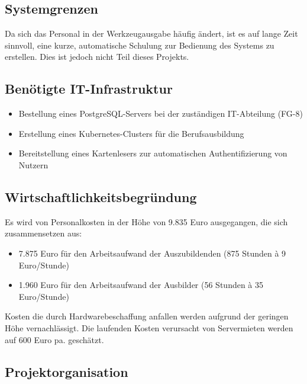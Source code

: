 \documentclass[a4paper, 12pt]{article}
\begin{document}
\vspace{1cm}

\subsection{Systemgrenzen}
Da sich das Personal in der Werkzeugausgabe häufig ändert, ist es auf lange Zeit sinnvoll, eine kurze, automatische Schulung zur Bedienung des Systems zu erstellen. Dies ist jedoch nicht Teil dieses Projekts.

\vspace{1cm}

\subsection{Benötigte IT-Infrastruktur}
\begin{itemize}[itemsep=0cm] 
    \item Bestellung eines PostgreSQL-Servers bei der zuständigen IT-Abteilung (FG-8)
    \item Erstellung eines Kubernetes-Clusters für die Berufsausbildung
    \item Bereitstellung eines Kartenlesers zur automatischen Authentifizierung von Nutzern
\end{itemize}

\vspace{1cm}
\newpage %

\subsection{Wirtschaftlichkeitsbegründung}
Es wird von Personalkosten in der Höhe von 9.835 Euro ausgegangen, die sich zusammensetzen aus:
\begin{itemize}[itemsep=0cm] 
    \item 7.875 Euro für den Arbeitsaufwand der Auszubildenden (875 Stunden à 9 Euro/Stunde)
    \item 1.960 Euro für den Arbeitsaufwand der Ausbilder (56 Stunden à 35 Euro/Stunde)
\end{itemize}
Kosten die durch Hardwarebeschaffung anfallen werden aufgrund der geringen Höhe vernachlässigt.
Die laufenden Kosten verursacht von Servermieten werden auf 600 Euro pa. geschätzt. 

\vspace{1cm}

\subsection{Projektorganisation}
\end{document}

